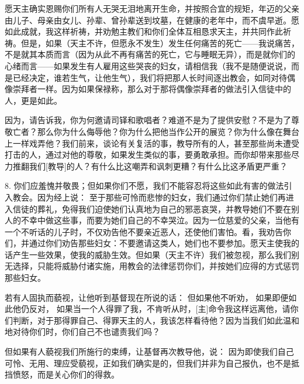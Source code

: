 愿天主确实恩赐你们所有人无哭无泪地离开生命，并按照合宜的规矩，年迈的父亲由儿子、母亲由女儿、孙辈、曾孙辈送到坟墓，在健康的老年中，而不虞早逝。愿如此成就，我这样祈祷，并劝勉主教们和你们全体互相恳求天主，并共同作此祈祷。但是，如果（天主不许，但愿永不发生）发生任何痛苦的死亡——我说痛苦，不是就其本质而言（因为从此不再有痛苦的死亡，它与睡眠无异），而是就你们的心绪而言——如果发生有人雇用这些哭丧的妇女，请相信我（我不是随便说说，而是已经决定，谁若生气，让他生气），我们将把那人长时间逐出教会，如同对待偶像崇拜者一样。因为如果保禄称，那么对于那将偶像崇拜者的做法引入信徒中的人，更是如此。\par

因为，请告诉我，你为何邀请司铎和歌唱者？难道不是为了提供安慰？不是为了尊敬亡者？那么你为什么侮辱他？你为什么把他当作公开的展览？你为什么像在舞台上一样戏弄他？我们前来，谈论有关复活的事，教导所有的人，甚至那些尚未遭受打击的人，通过对他的尊敬，如果发生类似的事，要勇敢承担。而你却带来那些尽力推翻我们[教导]的人？有什么比这嘲弄和讽刺更糟？有什么比这矛盾更严重？\par

8. 你们应羞愧并敬畏；但如果你们不愿，我们不能容忍将这些如此有害的做法引入教会。因为经上说： 至于那些可怜而悲惨的妇女，我们通过你们禁止她们再进入信徒的葬礼，免得我们迫使她们认真地为自己的邪恶哀哭，并教导她们不要在别人的不幸中做这些事，而要为她们自己的不幸哭泣。因为一位慈爱的父亲，当他有一个不听话的儿子时，不仅劝告他不要亲近恶人，还使他们害怕。看，我劝告你们，并通过你们劝告那些妇女：不要邀请这类人，她们也不要参加。愿天主使我的话产生一些效果，使我的威胁生效。但如果（天主不许）我们被忽视，那么我们别无选择，只能将威胁付诸实施，用教会的法律惩罚你们，并按她们应得的方式惩罚那些妇女。\par

若有人固执而藐视，让他听到基督现在所说的话： 但如果他不听劝， 如果即便如此他仍反对， 如果当一个人得罪了我，不肯听从时，[主]命令我这样远离他，请你们判断，对于那得罪自己、得罪天主的人，我该怎样看待他？因为当我们如此温和地对待你们时，你们自己不也谴责我们吗？\par

但如果有人藐视我们所施行的束缚，让基督再次教导他，说： 因为即使我们自己可怜、无用、理应受藐视，正如我们确实是的，但我们并非为自己报仇，也不是抵挡愤怒，而是关心你们的得救。\par

